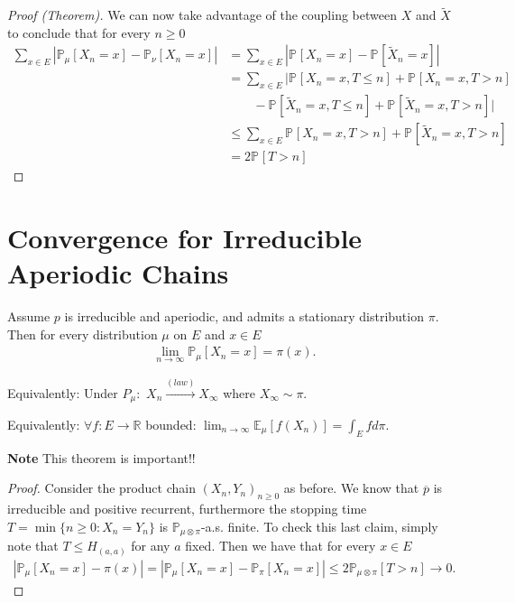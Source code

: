 \begin{proof}[Proof (Theorem)]
We can now take advantage of the coupling between $X$ and $\tilde{X}$ to conclude that for every $n\geq 0$ 
\begin{align}
	\sum_{x \in E}^{} \left| \mathbb{P}_{\mu} \left[ X_n = x \right] - \mathbb{P}_{\nu } \left[ X_n=x \right] \right|
	&= \sum_{x \in E}^{} \left| \mathbb{P}_{} \left[X_n =x  \right] - \mathbb{P}_{} \left[ \tilde{X}_n = x \right] \right| \\
	&= \sum_{x \in E}^{} \Big| \mathbb{P}_{} \left[ X_n =x, T \leq n \right] + \mathbb{P}_{} \left[ X_n = x, T>n \right] \\
	&\qquad  - \mathbb{P}_{} \left[ \tilde{X}_n = x, T \leq n \right] + \mathbb{P}_{} \left[ \tilde{X}_n = x, T>n \right] \Big| \\
	&\leq \sum_{x \in E}^{} \mathbb{P}_{} \left[ X_n=x, T>n \right] + \mathbb{P}_{} \left[ \tilde{X}_n=x, T>n \right]\\
	&= 2\mathbb{P}_{} \left[ T>n \right] 
\end{align}


\end{proof}




\section{Convergence for Irreducible Aperiodic Chains}
\begin{theorem}[]
	Assume $p$ is irreducible and aperiodic, and admits a stationary distribution $\pi $. Then for every distribution $\mu$ on $E$ and $x \in E$  
	\begin{align}
\boxed{	\lim_{n \to \infty}\mathbb{P}_{\mu } \left[ X_n=x \right] = \pi(x)}
	.\end{align}
	

	\noindent
	Equivalently: Under $P_\mu: $ $X_n \stackrel{(law)}{\to} X_\infty$ where $X_\infty \sim \pi$. 

	\noindent
	Equivalently: $\forall f:E \to \mathbb{R}$ bounded: $\lim_{n \to \infty} \mathbb{E}_{\mu } \left[ f(X_n) \right] = \int_{E}^{} f d \pi$.
\end{theorem}
\textbf{Note} This theorem is important!! 
\begin{proof}
	Consider the product chain $(X_n, Y_n)_{n\geq 0}$ as before. We know that $\overline{p}$ is irreducible and positive recurrent, furthermore the stopping time $T=\min\{n\geq 0: X_n = Y_n\}$ is $\mathbb{P}_{\mu \otimes \pi }$-a.s. finite. To check this last claim, simply note that $T \leq H_{(a,a)}$ for any $a$ fixed. Then we have that for every $x \in E$ 
\begin{align}
	\left| \mathbb{P}_{\mu } \left[ X_n = x \right] - \pi(x) \right| = \left|\mathbb{P}_{\mu } \left[ X_n = x \right] - \mathbb{P}_{\pi } \left[ X_n = x \right] \right| \leq 2 \mathbb{P}_{\mu \otimes \pi } \left[ T >n \right] \to 0 
	.\end{align}
\end{proof}


